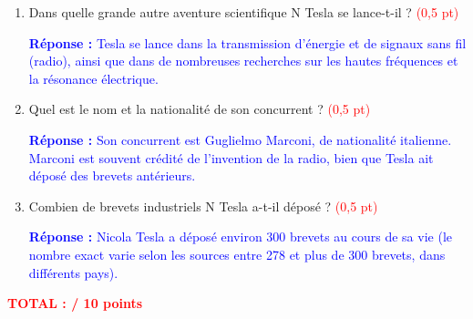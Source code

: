 \documentclass[10pt,a4paper]{article}
\begin{document}
\begin{enumerate}[itemsep=1mm]
\item Dans quelle grande autre aventure scientifique N Tesla se lance-t-il ? \hfill \textcolor{red}{(0,5 pt)}

{\small \textcolor{blue}{\textbf{Réponse :} Tesla se lance dans la transmission d'énergie et de signaux sans fil (radio), ainsi que dans de nombreuses recherches sur les hautes fréquences et la résonance électrique.}}

\item Quel est le nom et la nationalité de son concurrent ? \hfill \textcolor{red}{(0,5 pt)}

{\small \textcolor{blue}{\textbf{Réponse :} Son concurrent est Guglielmo Marconi, de nationalité italienne. Marconi est souvent crédité de l'invention de la radio, bien que Tesla ait déposé des brevets antérieurs.}}

\item Combien de brevets industriels N Tesla a-t-il déposé ? \hfill \textcolor{red}{(0,5 pt)}

{\small \textcolor{blue}{\textbf{Réponse :} Nicola Tesla a déposé environ 300 brevets au cours de sa vie (le nombre exact varie selon les sources entre 278 et plus de 300 brevets, dans différents pays).}}

\end{enumerate}

\vspace{2mm}
\begin{center}
\large{\textcolor{red}{\textbf{TOTAL : / 10 points}}}
\end{center}
\end{document}
